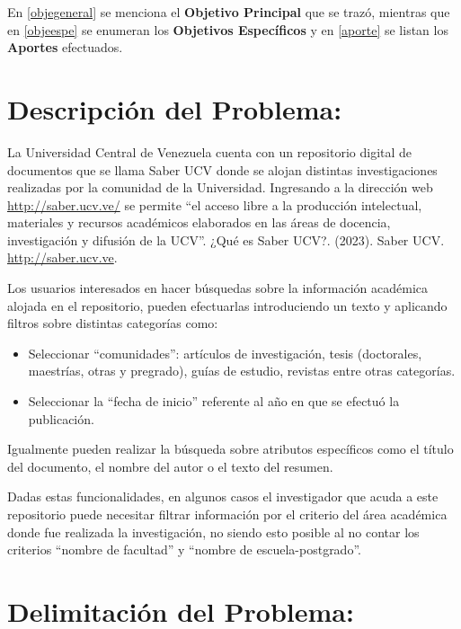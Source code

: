 \documentclass[
  12pt,
  openany]{book}
\begin{document}
En \ref{objegeneral} se menciona el \textbf{Objetivo Principal} que se trazó, mientras que en \ref{objeespe} se enumeran los \textbf{Objetivos Específicos} y en \ref{aporte} se listan los \textbf{Aportes} efectuados.

\hypertarget{desproblema}{%
\section{Descripción del Problema:}\label{desproblema}}

La Universidad Central de Venezuela cuenta con un repositorio digital de documentos que se llama Saber UCV donde se alojan distintas investigaciones realizadas por la comunidad de la Universidad. Ingresando a la dirección web \url{http://saber.ucv.ve/} se permite ``el acceso libre a la producción intelectual, materiales y recursos académicos elaborados en las áreas de docencia, investigación y difusión de la UCV''. ¿Qué es Saber UCV?. (2023). Saber UCV. \href{http://saber.ucv.ve/}{http://saber.ucv.ve}.

Los usuarios interesados en hacer búsquedas sobre la información académica alojada en el repositorio, pueden efectuarlas introduciendo un texto y aplicando filtros sobre distintas categorías como:

\begin{itemize}
\item
  Seleccionar ``comunidades'': artículos de investigación, tesis (doctorales, maestrías, otras y pregrado), guías de estudio, revistas entre otras categorías.
\item
  Seleccionar la ``fecha de inicio'' referente al año en que se efectuó la publicación.
\end{itemize}

Igualmente pueden realizar la búsqueda sobre atributos específicos como el título del documento, el nombre del autor o el texto del resumen.

Dadas estas funcionalidades, en algunos casos el investigador que acuda a este repositorio puede necesitar filtrar información por el criterio del área académica donde fue realizada la investigación, no siendo esto posible al no contar los criterios ``nombre de facultad'' y ``nombre de escuela-postgrado''.

\hypertarget{delimitacion}{%
\section{Delimitación del Problema:}\label{delimitacion}}
\end{document}
